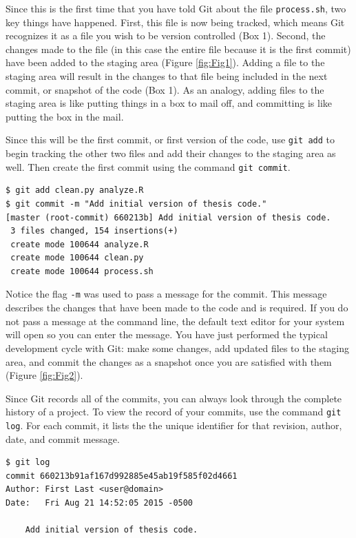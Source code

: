 \documentclass[10pt]{article}
\begin{document}
Since this is the first time that you have told Git about the file \verb|process.sh|, two key things have happened.
First, this file is now being tracked, which means Git recognizes it as a file you wish to be version controlled (Box 1).
Second, the changes made to the file (in this case the entire file because it is the first commit) have been added to the staging area (Figure \ref{fig:Fig1}).
Adding a file to the staging area will result in the changes to that file being included in the next commit, or snapshot of the code (Box 1).
As an analogy, adding files to the staging area is like putting things in a box to mail off, and committing is like putting the box in the mail.

Since this will be the first commit, or first version of the code, use \verb|git add| to begin tracking the other two files and add their changes to the staging area as well.
Then create the first commit using the command \verb|git commit|.

\begin{verbatim}
$ git add clean.py analyze.R
$ git commit -m "Add initial version of thesis code."
[master (root-commit) 660213b] Add initial version of thesis code.
 3 files changed, 154 insertions(+)
 create mode 100644 analyze.R
 create mode 100644 clean.py
 create mode 100644 process.sh
\end{verbatim}

Notice the flag \verb|-m| was used to pass a message for the commit.
This message describes the changes that have been made to the code and is required.
If you do not pass a message at the command line, the default text editor for your system will open so you can enter the message.
You have just performed the typical development cycle with Git:
make some changes, add updated files to the staging area, and commit the changes as a snapshot once you are satisfied with them (Figure \ref{fig:Fig2}).

Since Git records all of the commits, you can always look through the complete history of a project.
To view the record of your commits, use the command \verb|git log|.
For each commit, it lists the the unique identifier for that revision, author, date, and commit message.

\begin{verbatim}
$ git log
commit 660213b91af167d992885e45ab19f585f02d4661
Author: First Last <user@domain>
Date:   Fri Aug 21 14:52:05 2015 -0500

    Add initial version of thesis code.
\end{verbatim}
\end{document}
